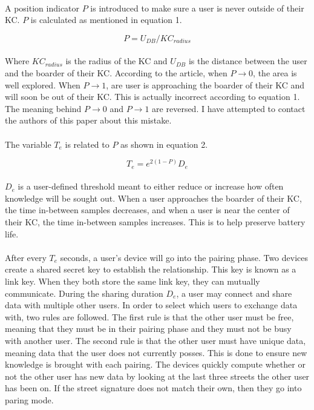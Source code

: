 \documentclass[a4paper,12pt]{article}
\begin{document}
\paragraph{}
A position indicator $P$ is introduced to make sure a user is never outside of their KC. $P$ is calculated as mentioned in equation 1.

\begin{equation}
P = U_{DB} / KC_{radius}
\end{equation}

\paragraph{}
Where $KC_{radius}$ is the radius of the KC and $U_{DB}$ is the distance between the user and the boarder of their KC. According to the article, when $P \rightarrow 0$, the area is well explored. When $P \rightarrow 1$, are user is approaching the boarder of their KC and will soon be out of their KC. This is actually incorrect according to equation 1. The meaning behind $P \rightarrow 0$ and $P \rightarrow 1$ are reversed. I have attempted to contact the authors of this paper about this mistake.
\paragraph{}
The variable $T_e$ is related to $P$ as shown in equation 2.

\begin{equation}
T_e = e^{2(1-P)} D_e
\end{equation}

\paragraph{}
$D_e$ is a user-defined threshold meant to either reduce or increase how often knowledge will be sought out. When a user approaches the boarder of their KC, the time in-between samples decreases, and when a user is near the center of their KC, the time in-between samples increases. This is to help preserve battery life. 
\paragraph{}
After every $T_e$ seconds, a user's device will go into the pairing phase. Two devices create a shared secret key to establish the relationship. This key is known as a link key. When they both store the same link key, they can mutually communicate. During the sharing duration $D_e$, a user may connect and share data with multiple other users. In order to select which users to exchange data with, two rules are followed. The first rule is that the other user must be free, meaning that they must be in their pairing phase and they must not be busy with another user. The second rule is that the other user must have unique data, meaning data that the user does not currently posses. This is done to ensure new knowledge is brought with each pairing. The devices quickly compute whether or not the other user has new data by looking at the last three streets the other user has been on. If the street signature does not match their own, then they go into paring mode.
\end{document}
